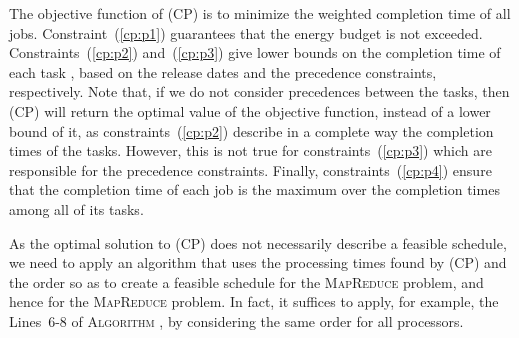 \documentclass{llncs}
\newcommand{\mr}{\textsc{MapReduce}\xspace}
\newcommand{\mrs}{\textsc{MapReduce}\xspace}
\newcommand{\algomr}{\textsc{Algorithm} \xspace}
\begin{document}
The objective function of (CP) is to minimize the weighted completion time of all jobs.
Constraint~(\ref{cp:p1}) guarantees that the energy budget is not exceeded.
Constraints~(\ref{cp:p2}) and~(\ref{cp:p3}) give lower bounds on the completion time of each task ,
based on the release dates and the precedence constraints, respectively.
Note that, if we do not consider precedences between the tasks,
then (CP) will return the optimal value of the objective function, instead of a lower bound of it,
as constraints~(\ref{cp:p2}) describe in a complete way the completion times of the tasks.
However, this is not true for constraints~(\ref{cp:p3}) which are responsible for the precedence constraints.
Finally, constraints~(\ref{cp:p4}) ensure that the completion time of each job is the maximum over the completion times among all of its tasks.

As the optimal solution to (CP) does not necessarily describe a feasible schedule,
we need to apply an algorithm that uses the processing times found by (CP) and the order  so as to create a feasible schedule for the \mrs problem,
and hence for the \mr problem.
In fact, it suffices to apply, for example, the Lines~6-8 of \algomr, by considering the same order for all processors.
\end{document}
